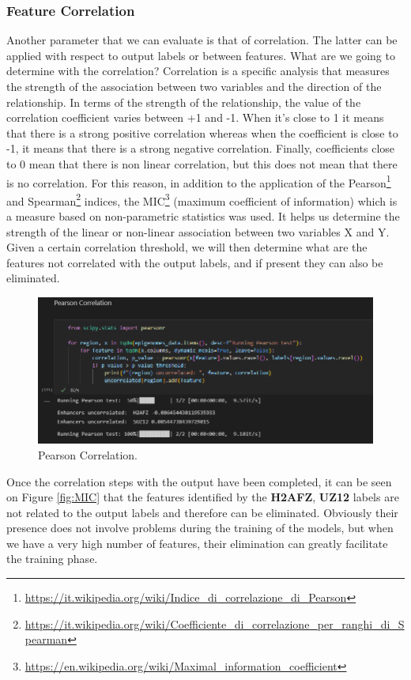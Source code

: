 \documentclass{article}
\begin{document}
\subsubsection{Feature Correlation}
\label{sec:Feature_Correlations}
Another parameter that we can evaluate is that of correlation. The latter can be applied with respect to output labels or between features. What are we going to determine with the correlation? Correlation is a specific analysis that measures the strength of the association between two variables and the direction of the relationship. In terms of the strength of the relationship, the value of the correlation coefficient varies between +1 and -1. When it's close to 1 it means that there is a strong positive correlation whereas when the coefficient is close to -1, it means that there is a strong negative correlation. Finally, coefficients close to 0 mean that there is non linear correlation, but this does not mean that there is no correlation. For this reason, in addition to the application of the Pearson\footnote{\url{https://it.wikipedia.org/wiki/Indice_di_correlazione_di_Pearson}} and Spearman\footnote{\url{https://it.wikipedia.org/wiki/Coefficiente_di_correlazione_per_ranghi_di_Spearman}} indices, the \acrshort{MIC}\footnote{\url{https://en.wikipedia.org/wiki/Maximal_information_coefficient}} (maximum coefficient of information) which is a measure based on non-parametric statistics was used. It helps us determine the strength of the linear or non-linear association between two variables X and Y. Given a certain correlation threshold, we will then determine what are the features not correlated with the output labels, and if present they can also be eliminated.

\begin{figure}[!ht]
    \centering
    \includegraphics[width=12cm]{image/Pearson.PNG}
    \caption{Pearson Correlation.}
    \label{fig:Pearson}
\end{figure}

\noindent
Once the correlation steps with the output have been completed, it can be seen on Figure \ref{fig:MIC} that the features identified by the \textbf{H2AFZ}, \textbf{UZ12} labels are not related to the output labels and therefore can be eliminated. Obviously their presence does not involve problems during the training of the models, but when we have a very high number of features, their elimination can greatly facilitate the training phase.
\end{document}
